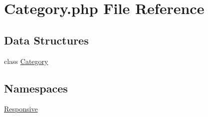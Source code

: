 \hypertarget{_category_8php}{}\section{Category.\+php File Reference}
\label{_category_8php}
\subsection*{Data Structures}
\begin{DoxyCompactItemize}
\item 
class \mbox{\hyperlink{class_responsive_1_1_category}{Category}}
\end{DoxyCompactItemize}
\subsection*{Namespaces}
\begin{DoxyCompactItemize}
\item 
 \mbox{\hyperlink{namespace_responsive}{Responsive}}
\end{DoxyCompactItemize}
